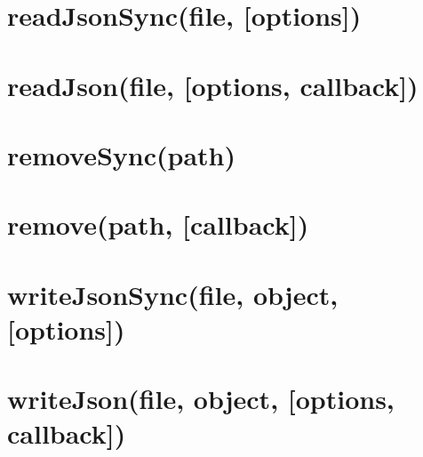 \documentclass[twoside]{book}
\newcommand{\+}{\discretionary{\mbox{\scriptsize$\hookleftarrow$}}{}{}}
\begin{document}
\chapter{read\+Json\+Sync(file, \mbox{[}options\mbox{]})}
\label{md_dsmacc_vis_degree_node_modules_electron-packager_node_modules_fs-extra_docs_readJson-sync}

\chapter{read\+Json(file, \mbox{[}options, callback\mbox{]})}
\label{md_dsmacc_vis_degree_node_modules_electron-packager_node_modules_fs-extra_docs_readJson}

\chapter{remove\+Sync(path)}
\label{md_dsmacc_vis_degree_node_modules_electron-packager_node_modules_fs-extra_docs_remove-sync}

\chapter{remove(path, \mbox{[}callback\mbox{]})}
\label{md_dsmacc_vis_degree_node_modules_electron-packager_node_modules_fs-extra_docs_remove}

\chapter{write\+Json\+Sync(file, object, \mbox{[}options\mbox{]})}
\label{md_dsmacc_vis_degree_node_modules_electron-packager_node_modules_fs-extra_docs_writeJson-sync}

\chapter{write\+Json(file, object, \mbox{[}options, callback\mbox{]})}
\label{md_dsmacc_vis_degree_node_modules_electron-packager_node_modules_fs-extra_docs_writeJson}

\end{document}
